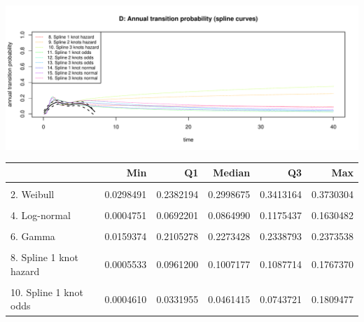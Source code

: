 \documentclass[]{article}
\begin{document}
\begin{flushleft}\includegraphics[height=0.29\textheight]{Images/validate_extrapolation2-4} \end{flushleft}

\begin{tabular}{lrrrrr}
\toprule
  & Min & Q1 & Median & Q3 & Max\\
\midrule
\cellcolor{gray!6}{1. Exponential} & \cellcolor{gray!6}{0.1278820} & \cellcolor{gray!6}{0.1278820} & \cellcolor{gray!6}{0.1278820} & \cellcolor{gray!6}{0.1278820} & \cellcolor{gray!6}{0.1278820}\\
2. Weibull & 0.0298491 & 0.2382194 & 0.2998675 & 0.3413164 & 0.3730304\\
\cellcolor{gray!6}{3. Gompertz} & \cellcolor{gray!6}{0.0960264} & \cellcolor{gray!6}{0.2326209} & \cellcolor{gray!6}{0.5026105} & \cellcolor{gray!6}{0.8415103} & \cellcolor{gray!6}{1.0000000}\\
4. Log-normal & 0.0004751 & 0.0692201 & 0.0864990 & 0.1175437 & 0.1630482\\
\cellcolor{gray!6}{5. Log-logistic} & \cellcolor{gray!6}{0.0150627} & \cellcolor{gray!6}{0.0512119} & \cellcolor{gray!6}{0.0722192} & \cellcolor{gray!6}{0.1148301} & \cellcolor{gray!6}{0.1673124}\\
6. Gamma & 0.0159374 & 0.2105278 & 0.2273428 & 0.2338793 & 0.2373538\\
\cellcolor{gray!6}{7. Generalised Gamma} & \cellcolor{gray!6}{0.0000000} & \cellcolor{gray!6}{0.0249765} & \cellcolor{gray!6}{0.0361491} & \cellcolor{gray!6}{0.0643696} & \cellcolor{gray!6}{0.1783037}\\
8. Spline 1 knot hazard & 0.0005533 & 0.0961200 & 0.1007177 & 0.1087714 & 0.1767370\\
\cellcolor{gray!6}{9. Spline 2 knots hazard} & \cellcolor{gray!6}{0.0000006} & \cellcolor{gray!6}{0.1921569} & \cellcolor{gray!6}{0.2213494} & \cellcolor{gray!6}{0.2415978} & \cellcolor{gray!6}{0.2568265}\\
10. Spline 1 knot odds & 0.0004610 & 0.0331955 & 0.0461415 & 0.0743721 & 0.1809477\\

\end{tabular}
\end{document}
